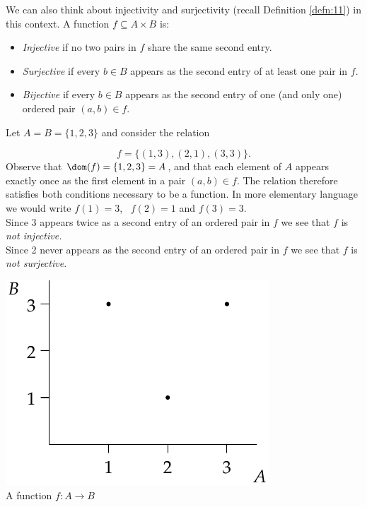 \noindent We can also think about injectivity and surjectivity (recall Definition \ref{defn:11}) in this context. A function $f\subseteq A\times B$ is:
\begin{itemize}
  \item \emph{Injective} if no two pairs in $f$ share the same second entry.
  \item \emph{Surjective} if every $b\in B$ appears as the second entry of at least one pair in $f$.
  \item \emph{Bijective} if every $b\in B$ appears as the second entry of one (and only one) ordered pair $(a,b)\in f$.
\end{itemize}


\begin{example}
Let $A=B=\{1,2,3\}$ and consider the relation\\
\noindent\begin{minipage}{0.62\textwidth}
\[f=\{(1,3),(2,1),(3,3)\}.\]
Observe that $\dom(f)=\{1,2,3\}=A$, and that each element of $A$ appears exactly once as the first element in a pair $(a,b)\in f$. The relation therefore satisfies both conditions necessary to be a function. In more elementary language we would write $f(1)=3$, \ $f(2)=1$ and $f(3)=3$.\\[5pt]
Since 3 appears twice as a second entry of an ordered pair in $f$ we see that $f$ is \emph{not injective.}\\[5pt]
Since 2 never appears as the second entry of an ordered pair in $f$ we see that $f$ is \emph{not surjective.}
\end{minipage}\hfill\begin{minipage}{0.33\textwidth}
\centering
\includegraphics[width=\textwidth]{relations-18-reln1}\\
A function $f:A\to B$
\end{minipage}
\end{example}

